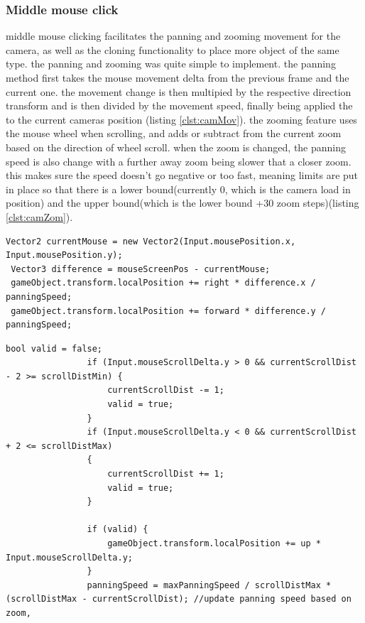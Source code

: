 \subsubsection{Middle mouse click}
middle mouse clicking facilitates the panning and zooming movement for the camera, as well as the cloning functionality to place more object of the same type. the panning and zooming was quite simple to implement. the panning method first takes the mouse movement delta from the previous frame and the current one. the movement change is then multipied by the respective direction transform and is then divided by the movement speed, finally being applied the to the current cameras position (listing \ref{clst:camMov}). the zooming feature uses the mouse wheel when scrolling, and adds or subtract from the current zoom based on the direction of wheel scroll. when the zoom is changed, the panning speed is also change with a further away zoom being slower that a closer zoom. this makes sure the speed doesn't go negative or too fast, meaning limits are put in place so that there is a lower bound(currently 0, which is the camera load in position) and the upper bound(which is the lower bound +30 zoom steps)(listing \ref{clst:camZom}).
\begin{lstlisting}[language={[Sharp]C}, caption=Camera movement code, label=clst:camMov]
Vector2 currentMouse = new Vector2(Input.mousePosition.x, Input.mousePosition.y);
 Vector3 difference = mouseScreenPos - currentMouse;
 gameObject.transform.localPosition += right * difference.x / panningSpeed;
 gameObject.transform.localPosition += forward * difference.y / panningSpeed;
\end{lstlisting}
\begin{lstlisting}[language={[Sharp]C}, caption=Camer zooming code, label=clst:camZom]
 bool valid = false;
                if (Input.mouseScrollDelta.y > 0 && currentScrollDist - 2 >= scrollDistMin) {
                    currentScrollDist -= 1;
                    valid = true;
                }
                if (Input.mouseScrollDelta.y < 0 && currentScrollDist + 2 <= scrollDistMax)
                {
                    currentScrollDist += 1;
                    valid = true;
                }

                if (valid) {
                    gameObject.transform.localPosition += up * Input.mouseScrollDelta.y;
                }
                panningSpeed = maxPanningSpeed / scrollDistMax * (scrollDistMax - currentScrollDist); //update panning speed based on zoom,
\end{lstlisting}

